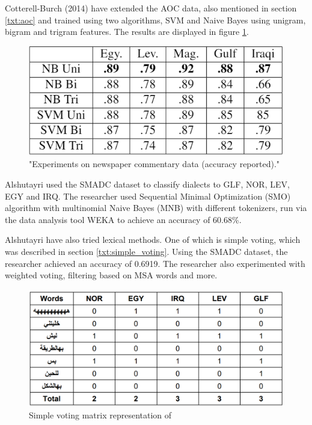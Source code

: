 \documentclass[12pt]{diazessay}
\begin{document}
        Cotterell-Burch (2014) have extended the AOC data, also mentioned in section \ref{txt:aoc} and trained using two algorithms, SVM and Naive Bayes using unigram, bigram and trigram features\cite{cotterell-callison-burch-2014-multi}. The results are displayed in figure \ref{fig:extended_aoc_results}.
        
        \begin{figure}[h]
            \includegraphics[scale=0.6]{Figures/results_extended_AOC.png}
            \caption{"Experiments on newspaper commentary data (accuracy reported)."\cite{cotterell-callison-burch-2014-multi}}
            \label{fig:extended_aoc_results}
        \end{figure}
        
        Alshutayri used the SMADC dataset to classify dialects to GLF, NOR, LEV, EGY and IRQ. The researcher used Sequential Minimal Optimization (SMO) algorithm with multinomial Naive Bayes (MNB) with different tokenizers, run via the data analysis tool WEKA to achieve an accuracy of 60.68\%\cite{alshutayri}.
        
        Alshutayri have also tried lexical methods. One of which is simple voting, which was described in section \ref{txt:simple_voting}. Using the SMADC dataset, the researcher achieved an accuracy of 0.6919. The researcher also experimented with weighted voting, filtering based on MSA words and more\cite{alshutayri}.
        
        \begin{figure}[h]
            \includegraphics[scale=0.35]{Figures/smadc_simple_voting.png}
            \caption{Simple voting matrix representation of \cite{alshutayri}}
        \end{figure}
        
\end{document}
